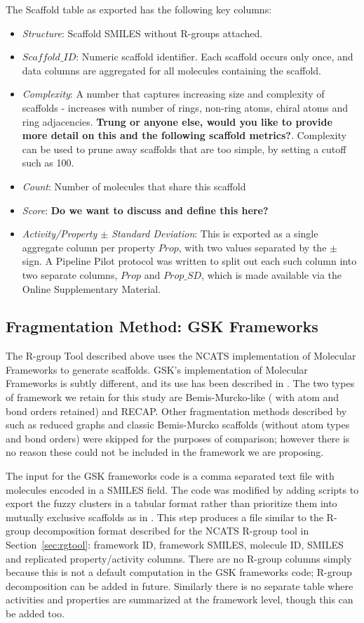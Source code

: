 \documentclass[journal=jacsat,manuscript=article]{achemso}
\newcommand*\sref[1]{Section~\ref{sec:#1}}
\begin{document}
The Scaffold table as exported has the following key columns:
\begin{itemize}
\item {\it Structure}: Scaffold SMILES without R-groups attached. 
\item {\it $Scaffold\_ID$}: Numeric scaffold identifier. Each scaffold occurs only once, and data columns are aggregated for all molecules containing the scaffold.
\item {\it Complexity}: A number that captures increasing size and complexity of scaffolds - increases with number of rings, non-ring atoms, chiral atoms and ring adjacencies. \textbf{Trung or anyone else, would you like to provide more detail on this and the following scaffold metrics?}. Complexity can be used to prune away scaffolds that are too simple, by setting a cutoff such as 100.  
\item {\it Count}: Number of molecules that share this scaffold
\item {\it Score}: \textbf{Do we want to discuss and define this here?}
\item {\it Activity/Property $\pm$ Standard Deviation}: This is exported as a single aggregate column per property $Prop$, with two values separated by the $\pm$ sign. A Pipeline Pilot protocol was written to split out each such column into two separate columns, $Prop$ and $Prop\_SD$, which is made available via the Online Supplementary Material. 
\end{itemize}

\subsection{Fragmentation Method: GSK Frameworks}
\label{sec:gskframe}
The R-group Tool described above uses the NCATS implementation of Molecular Frameworks to generate scaffolds. GSK's implementation of Molecular Frameworks is subtly different, and its use has been described in \citeauthor{Harper2004DDclus}. The two types of framework we retain for this study are Bemis-Murcko-like (\cite{BemisMurcko1996} with atom and bond orders retained) and RECAP\cite{Lewell:1998aa}. Other fragmentation methods described by \citeauthor{Harper2004DDclus} such as reduced graphs and classic Bemis-Murcko scaffolds (without atom types and bond orders) were skipped for the purposes of comparison; however there is no reason these could not be included in the framework we are proposing.    

The input for the GSK frameworks code is a comma separated text file with molecules encoded in a SMILES field.  The code was modified by adding scripts to export the fuzzy clusters in a tabular format rather than prioritize them into mutually exclusive scaffolds as in \citeauthor{Harper2004DDclus}. This step produces a file similar to the R-group decomposition format described for the NCATS R-group tool in \sref{rgtool}: framework ID, framework SMILES, molecule ID, SMILES and replicated property/activity columns.  There are no R-group columns simply because this is not a default computation in the GSK frameworks code; R-group decomposition can be added in future. Similarly there is no separate table where activities and properties are summarized at the framework level, though this can be added too.
\end{document}
